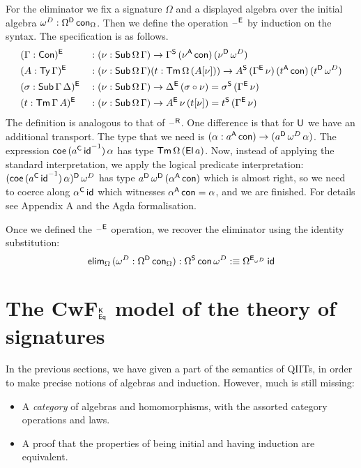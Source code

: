 \documentclass[acmsmall,screen]{acmart}
\begin{document}
For the eliminator we fix a signature $\Omega$ and a displayed algebra
over the initial algebra $\omega^D:\Omega^{\mathsf{D}}\,\mathsf{con}_\Omega$. Then we
define the operation $\mathord{\hspace{1pt}\text{--}\hspace{1pt}}^{\mathsf{E}}$ by induction on the syntax. The
specification is as follows.
\begin{alignat*}{5}
  & (\Gamma:\mathsf{Con})^{\mathsf{E}} && : (\nu:\mathsf{Sub}\,\Omega\,\Gamma)\rightarrow \Gamma^{\mathsf{S}}\,(\nu^{\mathsf{A}}\,\mathsf{con})\,(\nu^{\mathsf{D}}\,\omega^D) \\
  & (A:\mathsf{Ty}\,\Gamma)^{\mathsf{E}} && : (\nu:\mathsf{Sub}\,\Omega\,\Gamma)(t:\mathsf{Tm}\,\Omega\,(A[\nu]))\rightarrow A^{\mathsf{S}}\,(\Gamma^{\mathsf{E}}\,\nu)\,(t^{\mathsf{A}}\,\mathsf{con})\,(t^{\mathsf{D}}\,\omega^D) \\
  & (\sigma:\mathsf{Sub}\,\Gamma\,\Delta)^{\mathsf{E}} && : (\nu:\mathsf{Sub}\,\Omega\,\Gamma)\rightarrow \Delta^{\mathsf{E}}\,(\sigma\circ\nu) = \sigma^{\mathsf{S}}\,(\Gamma^{\mathsf{E}}\,\nu) \\
  & (t:\mathsf{Tm}\,\Gamma\,A)^{\mathsf{E}} && : (\nu:\mathsf{Sub}\,\Omega\,\Gamma)\rightarrow A^{\mathsf{E}}\,\nu\,(t[\nu]) = t^{\mathsf{S}}\,(\Gamma^{\mathsf{E}}\,\nu)
\end{alignat*}
The definition is analogous to that of $\mathord{\hspace{1pt}\text{--}\hspace{1pt}}^{\mathsf{R}}$. One difference is
that for $\mathsf{U}$ we have an additional transport. The type that we need
is $(\alpha:a^{\mathsf{A}}\,\mathsf{con})\rightarrow (a^{\mathsf{D}}\,\omega^D\,\alpha)$. The expression
$\mathsf{coe}\,({a^{\mathsf{C}}\,\mathsf{id}}^{-1})\,\alpha$ has type
$\mathsf{Tm}\,\Omega\,(\mathsf{El}\,a)$. Now, instead of applying the standard
interpretation, we apply the logical predicate interpretation:
$(\mathsf{coe}\,({a^{\mathsf{C}}\,\mathsf{id}}^{-1})\,\alpha)^{\mathsf{D}}\,\omega^D$ has type
$a^{\mathsf{D}}\,\omega^{\mathsf{D}}\,(\alpha^{\mathsf{A}}\,\mathsf{con})$ which is almost right, so we need
to coerce along $\alpha^{\mathsf{C}}\,\mathsf{id}$ which witnesses $\alpha^{\mathsf{A}}\,\mathsf{con} =
\alpha$, and we are finished. For details see Appendix A
and the Agda formalisation.

Once we defined the $\mathord{\hspace{1pt}\text{--}\hspace{1pt}}^{\mathsf{E}}$ operation, we recover the eliminator
using the identity substitution:
\[
\mathsf{elim}_\Omega\,(\omega^D:\Omega^{\mathsf{D}}\,\mathsf{con}_\Omega): \Omega^{\mathsf{S}}\,\mathsf{con}\,\omega^D :\equiv \Omega^{\mathsf{E}_{\omega^D}}\,\mathsf{id}
\]


\section{The CwF$^{\mathsf{K}}_{\mathsf{Eq}}$ model of the theory of signatures}
\label{sec:category}

In the previous sections, we have given a part of the semantics of QIITs, in order to make precise notions of algebras and induction. However, much is still missing:

\begin{itemize}
\item A \emph{category} of algebras and homomorphisms, with the assorted category operations and laws.
\item A proof that the properties of being initial and having induction are equivalent.
\end{itemize}
\end{document}
